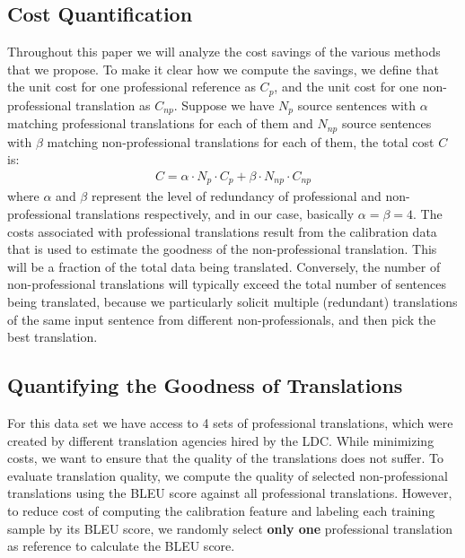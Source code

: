 \documentclass[11pt,letterpaper]{article}
\begin{document}
\subsection{Cost Quantification}
Throughout this paper we will analyze the cost savings of the various methods that we propose.
To make it clear how we compute the savings, we define that the unit cost for one professional reference as $C_{p}$, and the unit cost for one non-professional translation as $C_{np}$. Suppose we have $N_{p}$ source sentences with $\alpha$ matching professional translations for each of them and $N_{np}$  source sentences with $\beta$ matching non-professional translations for each of them, the total cost $C$ is:
  \begin{align*}
  C = \alpha \cdot N_{p} \cdot C_{p}  + \beta \cdot N_{np} \cdot C_{np} 
  \end{align*}
  where $\alpha$ and $\beta$ represent the level of redundancy of professional and non-professional translations respectively, and in our case, basically $\alpha = \beta = 4$.
The costs associated with professional translations result from the calibration data  that is used to estimate the goodness of the non-professional translation.  This will be a fraction of the total data being translated.  Conversely, the number of non-professional translations will typically exceed the total number of sentences being translated, because we particularly solicit multiple (redundant) translations of the same input sentence from different non-professionals, and then pick the best translation. 
 \subsection{Quantifying the Goodness of Translations}
For this data set we have access to 4 sets of professional translations, which were created by different translation agencies hired by the LDC. While minimizing costs, we want to ensure that the quality of the translations does not suffer.  To evaluate translation quality, we compute the quality of selected  non-professional translations using the BLEU score \cite{papineni2002bleu} against all professional translations. However, to reduce cost of computing the calibration feature and labeling each training sample by its BLEU score, we  randomly select \textbf{only one} professional translation as reference to calculate the BLEU score.
\end{document}
